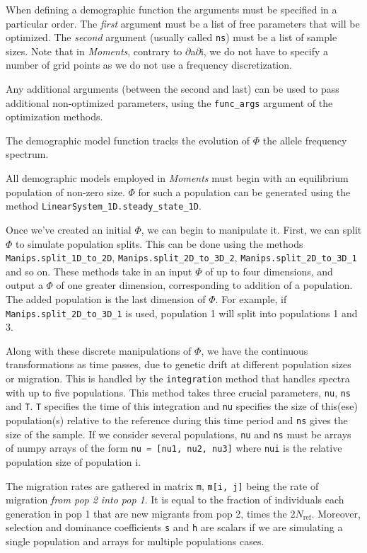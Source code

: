 \documentclass[12pt]{article}
\makeatletter
\newcommand{\dadi}{$\partial$a$\partial$i\xspace}
\newcommand{\Nref}{\ensuremath{N_\text{ref}}\xspace}
\newcommand{\py}[1]{\lstinline[breaklines=true,language=Python, showstringspaces=False]@#1@}
\makeatother
\begin{document}
When defining a demographic function the arguments must be specified in a particular order.
The \emph{first} argument must be a list of free parameters that will be optimized.
The \emph{second} argument (usually called \py{ns}) must be a list of sample sizes.
Note that in \textit{Moments}, contrary to \dadi, we do not have to specify a number of grid points as we do not use a frequency discretization. 

Any additional arguments (between the second and last) can be used to pass additional non-optimized parameters, using the \py{func_args} argument of the optimization methods.

The demographic model function tracks the evolution of $\Phi$ the allele frequency spectrum.

All demographic models employed in \textit{Moments} must begin with an equilibrium population of non-zero size.
$\Phi$ for such a population can be generated using the method \py{LinearSystem_1D.steady_state_1D}.

Once we've created an initial $\Phi$, we can begin to manipulate it.
First, we can split $\Phi$ to simulate population splits.
This can be done using the methods \py{Manips.split_1D_to_2D}, \py{Manips.split_2D_to_3D_2}, \py{Manips.split_2D_to_3D_1} and so on.
These methods take in an input $\Phi$ of up to four dimensions, and output a $\Phi$ of one greater dimension, corresponding to addition of a population.
The added population is the last dimension of $\Phi$.
For example, if \py{Manips.split_2D_to_3D_1} is used, population 1 will split into populations 1 and 3.

Along with these discrete manipulations of $\Phi$, we have the continuous transformations as time passes, due to genetic drift at different population sizes or migration.
This is handled by the \py{integration} method that handles spectra with up to five populations.
This method takes three crucial parameters, \py{nu}, \py{ns} and \py{T}.
\py{T} specifies the time of this integration and \py{nu} specifies the size of this(ese) population(s) relative to the reference during this time period and \py{ns} gives the size of the sample. If we consider several populations, \py{nu} and \py{ns} must be arrays of numpy arrays of the form \py{nu = [nu1, nu2, nu3]} where \py{nui} is the relative population size of population i.

The migration rates are gathered in matrix \py{m}, \py{m[i, j]} being the rate of migration \emph{from pop 2 into pop 1}. 
It is equal to the fraction of individuals each generation in pop 1 that are new migrants from pop 2, times the 2\Nref. Moreover, selection and dominance coefficients \py{s} and \py{h} are scalars if we are simulating a single population and arrays for multiple populations cases. 
\end{document}
